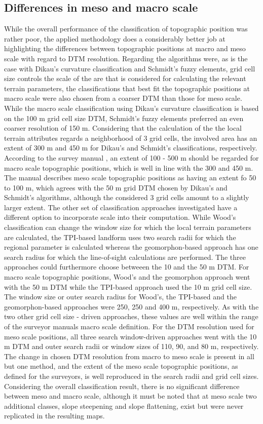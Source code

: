 \documentclass[preprint,12pt,authoryear]{elsarticle}
\begin{document}
\subsection{Differences in meso and macro scale}
While the overall performance of the classification of topographic position was rather poor, the applied methodology does a considerably better job at highlighting the differences between topographic positions at macro and meso scale with regard to DTM resolution.
Regarding the algorithms were, as is the case with Dikau's curvature classification and Schmidt's fuzzy elements, grid cell size controls the scale of the are that is considered for calculating the relevant terrain parameters, the classifications that best fit the topographic positions at macro scale were also chosen from a coarser DTM than those for meso scale. While the macro scale classification using Dikau's curvature classification is based on the 100 m grid cell size DTM, Schmidt's fuzzy elements preferred an even coarser resolution of 150 m. Considering that the calculation of the the local terrain attributes regards a neighborhood of 3 grid cells, the involved area has an extent of 300 m and 450 m for Dikau's and Schmidt's classifications, respectively. According to the survey manual \citep{Englisch1998}, an extent of 100 - 500 m should be regarded for macro scale topographic positions, which is well in line with the 300 and 450 m. The manual describes meso scale topographic positions as having an extent fo 50 to 100 m, which agrees with the 50 m grid DTM chosen by Dikau's and Schmidt's algorithms, although the considered 3 grid cells amount to a slightly larger extent.
The other set of classification approaches investigated have a different option to incorporate scale into their computation. While Wood's classification can change the window size for which the local terrain parameters are calculated, the TPI-based landform uses two search radii for which the regional parameter is calculated whereas the geomorphon-based approach has one search radius for which the line-of-sight calculations are performed. The three approaches could furthermore choose betweeen the 10 and the 50 m DTM. For macro scale topographic positions, Wood's and the geomorphon approach went with the 50 m DTM while the TPI-based approach used the 10 m grid cell size. The window size or outer search radius for Wood's, the TPI-based and the geomorphon-based approaches were 250, 250 and 400 m, respectively. As with the two other grid cell size - driven approaches, these values are well within the range of the surveyor manuals macro scale definition. For the DTM resolution used for meso scale positions, all three search window-driven approaches went with the 10 m DTM and outer search radii or window sizes of 110, 90, and 80 m, respectively. The change in chosen DTM resolution from macro to meso scale is present in all but one method, and the extent of the meso scale topographic positions, as defined for the surveyors, is well reproduced in the search radii and grid cell sizes.
Considering the overall classification result, there is no significant difference between meso and macro scale, although it must be noted that at meso scale two additional classes, slope steepening and slope flattening, exist but were never replicated in the resulting maps.
\end{document}
